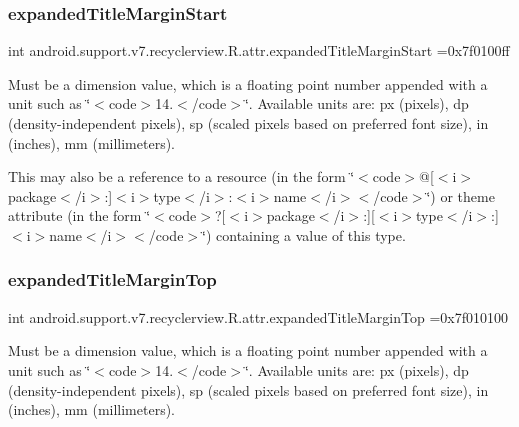\subsubsection{\texorpdfstring{expanded\+Title\+Margin\+Start}{expandedTitleMarginStart}}
{\footnotesize\ttfamily int android.\+support.\+v7.\+recyclerview.\+R.\+attr.\+expanded\+Title\+Margin\+Start =0x7f0100ff\hspace{0.3cm}{\ttfamily [static]}}

Must be a dimension value, which is a floating point number appended with a unit such as \char`\"{}$<$code$>$14.\+5sp$<$/code$>$\char`\"{}. Available units are\+: px (pixels), dp (density-\/independent pixels), sp (scaled pixels based on preferred font size), in (inches), mm (millimeters). 

This may also be a reference to a resource (in the form \char`\"{}$<$code$>$@\mbox{[}$<$i$>$package$<$/i$>$\+:\mbox{]}$<$i$>$type$<$/i$>$\+:$<$i$>$name$<$/i$>$$<$/code$>$\char`\"{}) or theme attribute (in the form \char`\"{}$<$code$>$?\mbox{[}$<$i$>$package$<$/i$>$\+:\mbox{]}\mbox{[}$<$i$>$type$<$/i$>$\+:\mbox{]}$<$i$>$name$<$/i$>$$<$/code$>$\char`\"{}) containing a value of this type. \mbox{\label{classandroid_1_1support_1_1v7_1_1recyclerview_1_1R_1_1attr_abf700dfd99b875d920ac2f2ce532ae10}} 
\subsubsection{\texorpdfstring{expanded\+Title\+Margin\+Top}{expandedTitleMarginTop}}
{\footnotesize\ttfamily int android.\+support.\+v7.\+recyclerview.\+R.\+attr.\+expanded\+Title\+Margin\+Top =0x7f010100\hspace{0.3cm}{\ttfamily [static]}}

Must be a dimension value, which is a floating point number appended with a unit such as \char`\"{}$<$code$>$14.\+5sp$<$/code$>$\char`\"{}. Available units are\+: px (pixels), dp (density-\/independent pixels), sp (scaled pixels based on preferred font size), in (inches), mm (millimeters). 

